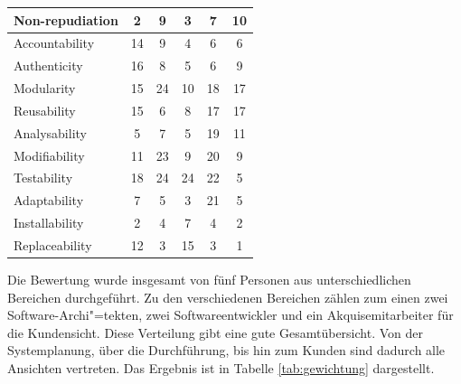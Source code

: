 \begin{table}[htb]
\begin{tabular}{|l|c|c|c|c|c|}
		Non-repudiation            &     2     &       9       &      3      &     7     &      10       \\ \hline
		Accountability             &    14     &       9       &      4      &     6     &       6       \\ \hline
		Authenticity               &    16     &       8       &      5      &     6     &       9       \\ \hline
		Modularity                 &    15     &      24       &     10      &    18     &      17       \\ \hline
		Reusability                &    15     &       6       &      8      &    17     &      17       \\ \hline
		Analysability              &     5     &       7       &      5      &    19     &      11       \\ \hline
		Modifiability              &    11     &      23       &      9      &    20     &       9       \\ \hline
		Testability                &    18     &      24       &     24      &    22     &       5       \\ \hline
		Adaptability               &     7     &       5       &      3      &    21     &       5       \\ \hline
		Installability             &     2     &       4       &      7      &     4     &       2       \\ \hline
		Replaceability             &    12     &       3       &     15      &     3     &       1       \\ \hline
	\end{tabular}
\end{table}

Die Bewertung wurde insgesamt von fünf Personen aus unterschiedlichen Bereichen durchgeführt. Zu den verschiedenen Bereichen zählen zum einen zwei Software-Archi"=tekten, zwei Softwareentwickler und ein Akquisemitarbeiter für die Kundensicht. Diese Verteilung gibt eine gute Gesamtübersicht. Von der Systemplanung, über die Durchführung, bis hin zum Kunden sind dadurch alle Ansichten vertreten.
Das Ergebnis ist in Tabelle \ref{tab:gewichtung} dargestellt. \\

